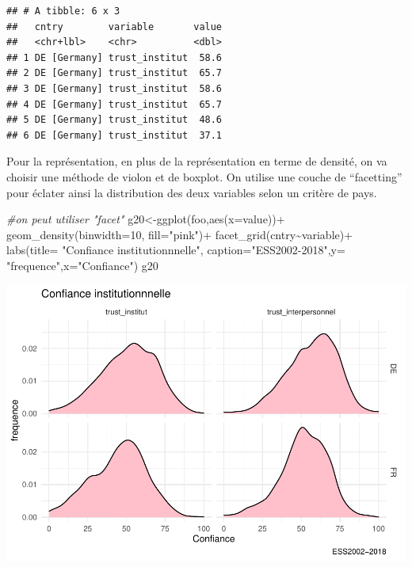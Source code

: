 \documentclass[
]{book}
\newenvironment{Shaded}{\begin{snugshade}}{\end{snugshade}}
\newcommand{\AttributeTok}[1]{\textcolor[rgb]{0.77,0.63,0.00}{#1}}
\newcommand{\CommentTok}[1]{\textcolor[rgb]{0.56,0.35,0.01}{\textit{#1}}}
\newcommand{\DecValTok}[1]{\textcolor[rgb]{0.00,0.00,0.81}{#1}}
\newcommand{\FunctionTok}[1]{\textcolor[rgb]{0.00,0.00,0.00}{#1}}
\newcommand{\NormalTok}[1]{#1}
\newcommand{\OtherTok}[1]{\textcolor[rgb]{0.56,0.35,0.01}{#1}}
\newcommand{\SpecialCharTok}[1]{\textcolor[rgb]{0.00,0.00,0.00}{#1}}
\newcommand{\StringTok}[1]{\textcolor[rgb]{0.31,0.60,0.02}{#1}}
\begin{document}
\begin{verbatim}
## # A tibble: 6 x 3
##   cntry        variable       value
##   <chr+lbl>    <chr>          <dbl>
## 1 DE [Germany] trust_institut  58.6
## 2 DE [Germany] trust_institut  65.7
## 3 DE [Germany] trust_institut  58.6
## 4 DE [Germany] trust_institut  65.7
## 5 DE [Germany] trust_institut  48.6
## 6 DE [Germany] trust_institut  37.1
\end{verbatim}

Pour la représentation, en plus de la représentation en terme de densité, on va choisir une méthode de violon et de boxplot. On utilise une couche de ``facetting'' pour éclater ainsi la distribution des deux variables selon un critère de pays.

\begin{Shaded}
\begin{Highlighting}[]
\CommentTok{\#on peut utiliser "facet"}
\NormalTok{g20}\OtherTok{\textless{}{-}}\FunctionTok{ggplot}\NormalTok{(foo,}\FunctionTok{aes}\NormalTok{(}\AttributeTok{x=}\NormalTok{value))}\SpecialCharTok{+} \FunctionTok{geom\_density}\NormalTok{(}\AttributeTok{binwidth=}\DecValTok{10}\NormalTok{, }\AttributeTok{fill=}\StringTok{"pink"}\NormalTok{)}\SpecialCharTok{+} \FunctionTok{facet\_grid}\NormalTok{(cntry}\SpecialCharTok{\textasciitilde{}}\NormalTok{variable)}\SpecialCharTok{+}   
  \FunctionTok{labs}\NormalTok{(}\AttributeTok{title=} \StringTok{"Confiance institutionnnelle"}\NormalTok{, }\AttributeTok{caption=}\StringTok{"ESS2002{-}2018"}\NormalTok{,}\AttributeTok{y=} \StringTok{"frequence"}\NormalTok{,}\AttributeTok{x=}\StringTok{"Confiance"}\NormalTok{)}
\NormalTok{g20}
\end{Highlighting}
\end{Shaded}

\includegraphics{bookdown-demo_files/figure-latex/418-1.pdf}
\end{document}
